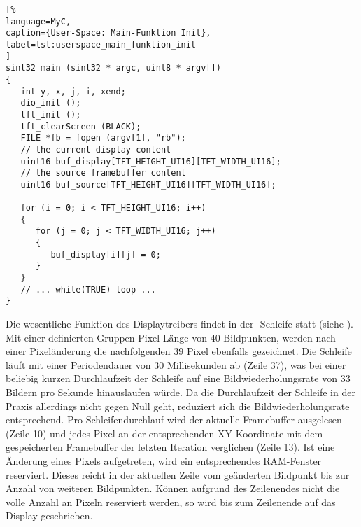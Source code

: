 \begin{lstlisting}[%
language=MyC,
caption={User-Space: Main-Funktion Init},
label=lst:userspace_main_funktion_init
]
sint32 main (sint32 * argc, uint8 * argv[])
{
   int y, x, j, i, xend;
   dio_init ();
   tft_init ();
   tft_clearScreen (BLACK);	   
   FILE *fb = fopen (argv[1], "rb");
   // the current display content
   uint16 buf_display[TFT_HEIGHT_UI16][TFT_WIDTH_UI16];
   // the source framebuffer content   
   uint16 buf_source[TFT_HEIGHT_UI16][TFT_WIDTH_UI16];

   for (i = 0; i < TFT_HEIGHT_UI16; i++)
   {
      for (j = 0; j < TFT_WIDTH_UI16; j++)
      {
         buf_display[i][j] = 0;
      }
   }
   // ... while(TRUE)-loop ...
}
\end{lstlisting}
Die wesentliche Funktion des Displaytreibers findet in der -Schleife statt (siehe ). Mit einer definierten Gruppen-Pixel-Länge  von 40 Bildpunkten, werden nach einer Pixeländerung die nachfolgenden 39 Pixel ebenfalls gezeichnet. Die Schleife läuft mit einer Periodendauer von 30 Millisekunden ab (Zeile 37), was bei einer  beliebig kurzen Durchlaufzeit der Schleife auf eine Bildwiederholungsrate von 33 Bildern pro Sekunde hinauslaufen würde. Da die Durchlaufzeit der Schleife in der Praxis allerdings nicht gegen Null geht, reduziert sich die Bildwiederholungsrate entsprechend. Pro Schleifendurchlauf wird der aktuelle Framebuffer ausgelesen (Zeile 10) und jedes Pixel an der entsprechenden XY-Koordinate mit dem gespeicherten Framebuffer der letzten Iteration verglichen (Zeile 13). Ist eine Änderung eines Pixels aufgetreten, wird ein entsprechendes RAM-Fenster reserviert. Dieses reicht in der aktuellen Zeile vom geänderten Bildpunkt bis zur Anzahl von  weiteren Bildpunkten. Können aufgrund des Zeilenendes nicht die volle Anzahl an Pixeln reserviert werden, so wird bis zum Zeilenende auf das Display geschrieben.

